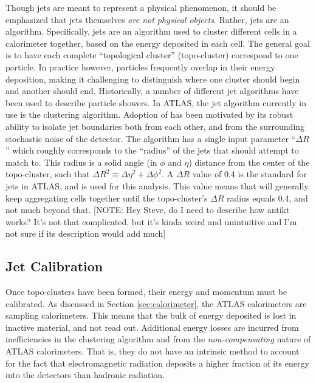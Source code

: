         Though jets are meant to represent a physical phenomenon,
            it should be emphasized that jets themselves \textit{are not physical objects}.
        Rather, jets are an algorithm.
        Specifically, jets are an algorithm used to cluster different cells in a calorimeter together,
            based on the energy deposited in each cell.
        The general goal is to have each complete ``topological cluster'' (topo-cluster) correspond to one particle.
        In practice however, particles frequently overlap in their energy deposition,
            making it challenging to distinguish where one cluster should begin and another should end.
        Historically, a number of different jet algorithms have been used to describe particle showers.
        In ATLAS, the jet algorithm currently in use is the \textit{\antikt} clustering algorithm\cite{anti_kt}.
        Adoption of \antikt has been motivated by its robust ability to isolate jet boundaries both from each other,
            and from the surrounding stochastic noise of the detector.
        The \antikt algorithm has a single input parameter ``$\Delta R$'' which roughly corresponds to the ``radius''
            of the jets that \antikt should attempt to match to.
        This radius is a solid angle (in $\phi$ and $\eta$) distance from the center of the topo-cluster,
            such that $\Delta R^2 \equiv \Delta \eta^2 + \Delta \phi^2$.
        A $\Delta R$ value of 0.4 is the standard for jets in ATLAS, and is used for this analysis.
        This value means that \antikt will generally keep aggregating cells together until the topo-cluster's
            $\Delta R$ radius equals 0.4, and not much beyond that.
        [NOTE: Hey Steve, do I need to describe how antikt works?
        It's not that complicated, but it's kinda weird and unintuitive and I'm not sure if its description would add much]

        \FloatBarrier
        \subsection{Jet Calibration}

        Once topo-clusters have been formed, their energy and momentum must be calibrated.
        As discussed in Section \ref{sec:calorimeter}, the ATLAS calorimeters are sampling calorimeters.
        This means that the bulk of energy deposited is lost in inactive material, and not read out.
        Additional energy losses are incurred from inefficiencies in the clustering algorithm and from the \textit{non-compensating} nature of ATLAS calorimeters.
        That is, they do not have an intrinsic method to account for the fact that electromagnetic radiation deposits a higher fraction of its energy into the detectors than hadronic radiation\cite{cell_clustering}.

